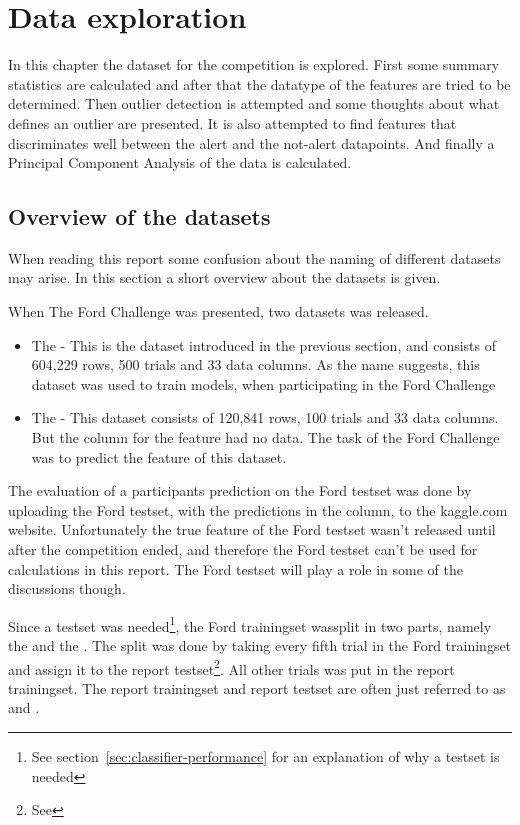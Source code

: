 \chapter{Data exploration}
In this chapter the dataset for the competition is explored. First some summary statistics are calculated and after that the datatype of the features are tried to be determined. Then outlier detection is attempted and some thoughts about what defines an outlier are presented. It is also attempted to find features that discriminates well between the alert and the not-alert datapoints. And finally a Principal Component Analysis of the data is calculated. 


\section{Overview of the datasets}
When reading this report some confusion about the naming of different datasets may arise. In this section a short overview about the datasets is given. \par
When The Ford Challenge was presented, two datasets was released.
\begin{itemize}
    \item The  - This is the dataset introduced in the previous section, and consists of 604,229 rows, 500 trials and 33 data columns. As the name suggests, this dataset was used to train models, when participating in the Ford Challenge
    \item The  - This dataset consists of 120,841 rows, 100 trials and 33 data columns. But the column for the  feature had no data. The task of the Ford Challenge was to predict the  feature of this dataset. 
\end{itemize}
The evaluation of a participants prediction on the Ford testset was done by uploading the Ford testset, with the predictions in the  column, to the kaggle.com website. Unfortunately the true  feature of the Ford testset wasn't released until after the competition ended, and therefore the Ford testset can't be used for calculations in this report. The Ford testset will play a role in some of the discussions though. \par
Since a testset was needed\footnote{See section~\ref{sec:classifier-performance} for an explanation of why a testset is needed}, the Ford trainingset wassplit in two parts, namely the  and the . The split was done by taking every fifth trial in the Ford trainingset and assign it to the report testset\footnote{See }. All other trials was put in the report trainingset. The report trainingset and report testset are often just referred to as  and .


